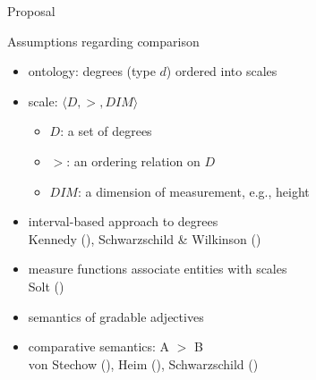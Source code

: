 \documentclass[12pt]{beamer}
\begin{document}
	\begin{frame}{Proposal}
		
		Assumptions regarding comparison
		
		\begin{itemize}
			\item ontology: degrees (type $d$) ordered into scales
			\item scale: $\langle D, >, DIM\rangle$ 
			\begin{itemize}
				\item $D$: a set of degrees
				\item $>$: an ordering relation on $D$
				\item $DIM$: a dimension of measurement, e.g., height
			\end{itemize}
			\item interval-based approach to degrees\\\scriptsize Kennedy (\citeyear{kennedy2001polar}), Schwarzschild \& Wilkinson (\citeyear{schwarzschild_wilkinson2002quantifiers})\normalsize
			\item measure functions associate entities with scales\\\scriptsize Solt (\citeyear{solt2015q-adjectives})\normalsize
			\item semantics of gradable adjectives
            \item comparative semantics: A $>$ B\\\scriptsize von Stechow (\citeyear{von_stechow1984comparing}), Heim (\citeyear{heim2000degree}), Schwarzschild (\citeyear{schwarzschild2008semantics})\normalsize
		\end{itemize}

\end{frame}
\end{document}
